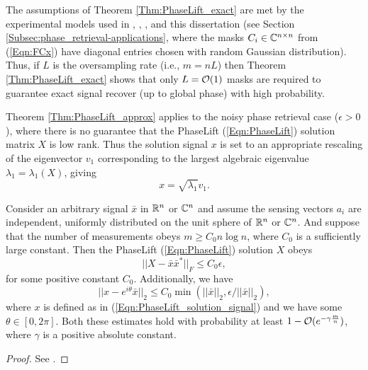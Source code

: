 \begin{enumerate}
The assumptions of Theorem \ref{Thm:PhaseLift_exact} are met by the experimental models used in \cite{DBLP:journals/siamis/CandesESV13}, \cite{candes2013phaselift}, \cite{DBLP:journals/siamsc/FriedlanderM16}, and this dissertation (see Section \ref{Subsec:phase_retrieval-applications}, where the masks $C_i \in {\mathbb C}^{n \times n}$ from (\ref{Eqn:FCx}) have diagonal entries chosen with random Gaussian distribution).  Thus, if $L$ is the oversampling rate (i.e., $m = nL$) then Theorem \ref{Thm:PhaseLift_exact} shows that only $L = {\mathcal O}(1)$ masks are required to guarantee exact signal recover (up to global phase) with high probability.




Theorem \ref{Thm:PhaseLift_approx} applies to the  noisy phase retrieval case ($\epsilon > 0$), where there is no guarantee that the PhaseLift (\ref{Eqn:PhaseLift}) solution matrix $X$ is low rank.  Thus the solution signal $x$ is set to an appropriate rescaling of the eigenvector $v_1$ corresponding to the largest algebraic eigenvalue $\lambda_1 = \lambda_1 (X)$, giving
\begin{equation}  			\label{Eqn:PhaseLift_solution_signal}
x = \sqrt{\lambda_1}v_1.
\end{equation}

\begin{theorem}  \label{Thm:PhaseLift_approx}
Consider an arbitrary signal $\bar{x}$ in ${\mathbb R}^n$ or ${\mathbb C}^n$ and assume the sensing vectors $a_i$ are independent, uniformly distributed on the unit sphere of ${\mathbb R}^n$ or ${\mathbb C}^n$.  And suppose that the number of measurements obeys $m \geq C_0 n \log n $, where $C_0$ is a sufficiently large constant.  Then the PhaseLift (\ref{Eqn:PhaseLift}) solution $X$ obeys
\begin{equation}				\label{Eqn:Thm_PhaseLift_approx_X}
||X - \bar{x}\bar{x}^*||_F \leq C_0 \epsilon,
\end{equation}
for some positive constant $C_0$.  Additionally, we have
\begin{equation}		\label{Eqn:Thm_PhaseLift_approx_x}
||x - e^{i \theta}\bar{x}||_2 \leq C_0 \min(||\bar{x}||_2, \epsilon / ||\bar{x}||_2),
\end{equation}
where $x$ is defined as in (\ref{Eqn:PhaseLift_solution_signal}) and we have some $\theta \in [0, 2\pi]$.
Both these estimates hold with probability at least $1 - {\mathcal O}(e^{-\gamma \frac{m}{n}})$, where $\gamma$ is a positive absolute constant.
\end{theorem}
\begin{proof}
See \cite[Section 6]{candes2013phaselift}.
\end{proof}



\end{enumerate}
